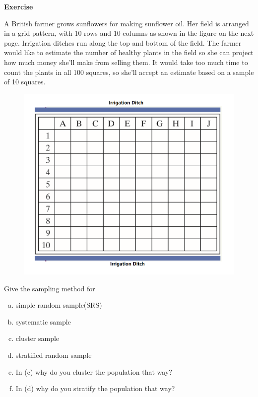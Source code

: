 \documentclass[a4paper, 12pt,twoside]{book}
\begin{document}
\colorbox{champagne}{\parbox{0.95\textwidth}{

    \textbf{Exercise}
    
    A British farmer grows sunflowers for making sunflower oil. Her field is  arranged in a grid pattern, with 10 rows and 10 columns as shown in the  figure on the next page. Irrigation ditches run along the top and bottom of the field. The farmer would like to estimate the number of healthy plants in the field so she can project how much money she’ll make from selling them. It would take too much time to count the plants in all 100 squares, so she’ll accept an estimate based on a sample of 10 squares.
    
    \begin{figure}[H]
        \centering
        \includegraphics[scale=0.3]{Sunflower}
    \end{figure}

Give the sampling method for
   \begin{enumerate}[(a)]
       \item simple random sample(SRS)
       \item systematic sample
       \item cluster sample 
       \item stratified random sample
       \item In (c) why do you cluster the population that way?
       \item In (d) why do you stratify the population that way?
   \end{enumerate}
}}
\newpage
\end{document}
